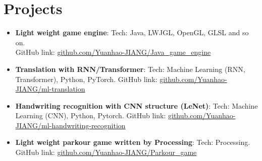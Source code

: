 \documentclass[12pt, a4paper]{article}
\newcommand{\resumeItem}[2]{
  \item\small{
    \textbf{#1}{#2 \vspace{-2pt}}
  }
}
\newcommand{\resumeSubItem}[2]{\resumeItem{#1}{#2}\vspace{-3pt}}
\newcommand{\resumeSubHeadingListStart}{\begin{itemize}[leftmargin=*]}
\newcommand{\resumeSubHeadingListEnd}{\end{itemize}}
\begin{document}
\vspace{-5pt}
\section{Projects}
\resumeSubHeadingListStart
\resumeSubItem{Light weight game engine}{: Tech: Java, LWJGL, OpenGL, GLSL and so on.\\
GitHub link: \href{https://github.com/Yuanhao-JIANG/Java\_game\_engine}{github.com/Yuanhao-JIANG/Java\_game\_engine}}
\vspace{2pt}
\resumeSubItem{Translation with RNN/Transformer}
{: Tech: Machine Learning (RNN, Transformer), Python, PyTorch.
GitHub link: \href{https://github.com/Yuanhao-JIANG/ml-translation}{github.com/Yuanhao-JIANG/ml-translation}}
\resumeSubItem{Handwriting recognition with CNN structure (LeNet)}
{: Tech: Machine Learning (CNN), Python, Pytorch.
GitHub link: \href{https://github.com/Yuanhao-JIANG/ml-handwriting-recognition}
{github.com/Yuanhao-JIANG/ml-handwriting-recognition}}
\resumeSubItem{Light weight parkour game written by Processing}{: Tech: Processing.\\
GitHub link: \href{https://github.com/Yuanhao-JIANG/Parkour_game}{github.com/Yuanhao-JIANG/Parkour\_game}}
\resumeSubHeadingListEnd


\end{document}
